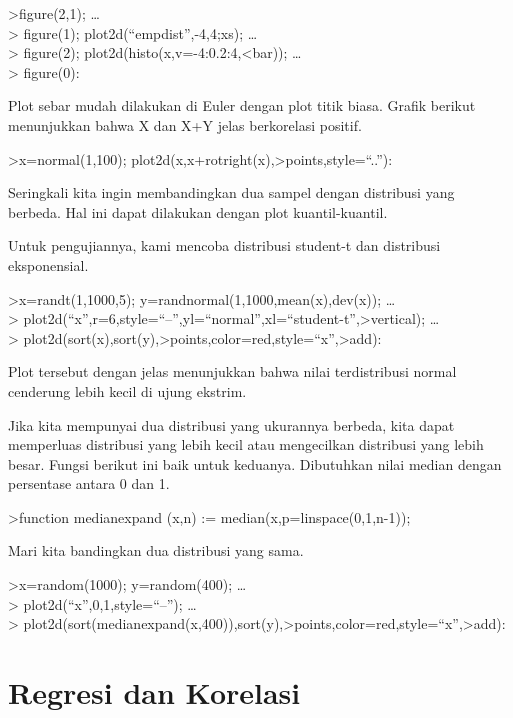 \documentclass[
]{book}
\begin{document}
\textgreater figure(2,1); \ldots{}\\
\textgreater{} figure(1); plot2d(``empdist'',-4,4;xs); \ldots{}\\
\textgreater{} figure(2); plot2d(histo(x,v=-4:0.2:4,\textless bar)); \ldots{}\\
\textgreater{} figure(0):

Plot sebar mudah dilakukan di Euler dengan plot titik biasa. Grafik berikut menunjukkan bahwa X dan X+Y jelas berkorelasi positif.

\textgreater x=normal(1,100); plot2d(x,x+rotright(x),\textgreater points,style=``..''):

Seringkali kita ingin membandingkan dua sampel dengan distribusi yang berbeda. Hal ini dapat dilakukan dengan plot kuantil-kuantil.

Untuk pengujiannya, kami mencoba distribusi student-t dan distribusi eksponensial.

\textgreater x=randt(1,1000,5); y=randnormal(1,1000,mean(x),dev(x)); \ldots{}\\
\textgreater{} plot2d(``x'',r=6,style=``--'',yl=``normal'',xl=``student-t'',\textgreater vertical); \ldots{}\\
\textgreater{} plot2d(sort(x),sort(y),\textgreater points,color=red,style=``x'',\textgreater add):

Plot tersebut dengan jelas menunjukkan bahwa nilai terdistribusi normal cenderung lebih kecil di ujung ekstrim.

Jika kita mempunyai dua distribusi yang ukurannya berbeda, kita dapat memperluas distribusi yang lebih kecil atau mengecilkan distribusi yang lebih besar. Fungsi berikut ini baik untuk keduanya. Dibutuhkan nilai median dengan persentase antara 0 dan 1.

\textgreater function medianexpand (x,n) := median(x,p=linspace(0,1,n-1));

Mari kita bandingkan dua distribusi yang sama.

\textgreater x=random(1000); y=random(400); \ldots{}\\
\textgreater{} plot2d(``x'',0,1,style=``--''); \ldots{}\\
\textgreater{} plot2d(sort(medianexpand(x,400)),sort(y),\textgreater points,color=red,style=``x'',\textgreater add):

\chapter{Regresi dan Korelasi}\label{regresi-dan-korelasi}
\end{document}
